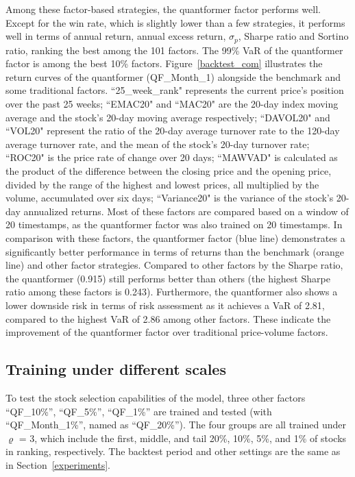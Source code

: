 \documentclass[preprint,12pt]{elsarticle}
\begin{document}
Among these factor-based strategies, the quantformer factor performs well. Except for the win rate, which is slightly lower than a few strategies, it performs well in terms of annual return, annual excess return, $\sigma_p$, Sharpe ratio and Sortino ratio, ranking the best among the 101 factors. The 99\% VaR of the quantformer factor is among the best 10\% factors. Figure~\ref{backtest_com} illustrates the return curves of the quantformer (QF\_Month\_1) alongside the benchmark and some traditional factors. ``25\_week\_rank" represents the current price's position over the past 25 weeks; ``EMAC20" and ``MAC20" are the 20-day index moving average and the stock's 20-day moving average respectively; ``DAVOL20" and ``VOL20" represent the ratio of the 20-day average turnover rate to the 120-day average turnover rate, and the mean of the stock's 20-day turnover rate; ``ROC20" is the price rate of change over 20 days; ``MAWVAD" is calculated as the product of the difference between the closing price and the opening price, divided by the range of the highest and lowest prices, all multiplied by the volume, accumulated over six days; ``Variance20" is the variance of the stock's 20-day annualized returns. Most of these factors are compared based on a window of 20 timestamps, as the quantformer factor was also trained on 20 timestamps. In comparison with these factors, the quantformer factor (blue line) demonstrates a significantly better performance in terms of returns than the benchmark (orange line) and other factor strategies. Compared to other factors by the Sharpe ratio, the quantformer (0.915) still performs better than others (the highest Sharpe ratio among these factors is 0.243). Furthermore, the quantformer also shows a lower downside risk in terms of risk assessment as it achieves a VaR of 2.81, compared to the highest VaR of 2.86 among other factors. These indicate the improvement of the quantformer factor over traditional price-volume factors. 

\subsection{Training under different scales}
\label{scales}
To test the stock selection capabilities of the model, three other factors ``QF\_10\%'', ``QF\_5\%'', ``QF\_1\%'' are trained and tested (with ``QF\_Month\_1\%'', named as ``QF\_20\%''). The four groups are all trained under $\varrho$ = 3, which include the first, middle, and tail 20\%, 10\%, 5\%, and 1\% of stocks in ranking, respectively. The backtest period and other settings are the same as in Section~\ref{experiments}.
\end{document}
